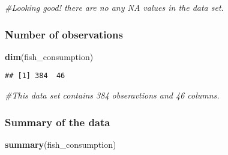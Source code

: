 \documentclass[
]{article}
\newenvironment{Shaded}{\begin{snugshade}}{\end{snugshade}}
\newcommand{\CommentTok}[1]{\textcolor[rgb]{0.56,0.35,0.01}{\textit{#1}}}
\newcommand{\FunctionTok}[1]{\textcolor[rgb]{0.13,0.29,0.53}{\textbf{#1}}}
\newcommand{\NormalTok}[1]{#1}
\begin{document}
\begin{Shaded}
\begin{Highlighting}[]
\CommentTok{\#Looking good! there are no any NA values in the data set. }
\end{Highlighting}
\end{Shaded}

\hypertarget{number-of-observations}{%
\subsubsection{Number of observations}\label{number-of-observations}}

\begin{Shaded}
\begin{Highlighting}[]
\FunctionTok{dim}\NormalTok{(fish\_consumption)}
\end{Highlighting}
\end{Shaded}

\begin{verbatim}
## [1] 384  46
\end{verbatim}

\begin{Shaded}
\begin{Highlighting}[]
\CommentTok{\#This data set contains 384 obseravtions and 46 columns.}
\end{Highlighting}
\end{Shaded}

\hypertarget{summary-of-the-data}{%
\subsubsection{Summary of the data}\label{summary-of-the-data}}

\begin{Shaded}
\begin{Highlighting}[]
\FunctionTok{summary}\NormalTok{(fish\_consumption)}
\end{Highlighting}
\end{Shaded}
\end{document}
